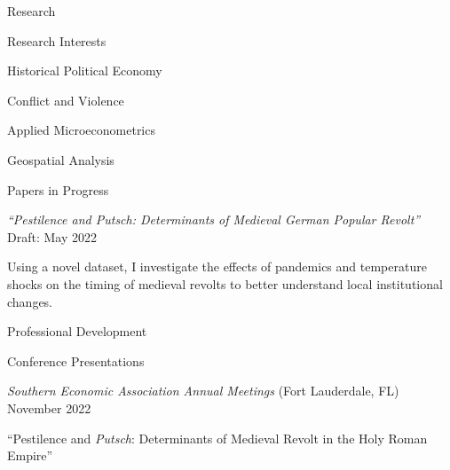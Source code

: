 \documentclass{resume} %
\begin{document}
\begin{rSection}{Research}

    \begin{rSubsection}{Research Interests}{}{}{}
        \item Historical Political Economy
        \item Conflict and Violence
        \item Applied Microeconometrics
        \item Geospatial Analysis
    \end{rSubsection}
    \vspace{-1mm} %
    \begin{rSubsection}{Papers in Progress}{}{}{}
        \item[] \hspace{-5mm} \textit{``Pestilence and \textrm{Putsch}: Determinants of Medieval German Popular Revolt''} \hfill{Draft: May 2022}
        \item Using a novel dataset, I investigate the effects of pandemics and temperature shocks on the timing of medieval revolts to better understand local institutional changes.
    \end{rSubsection}

\end{rSection}


\begin{rSection}{Professional Development}

    \begin{rSubsection}{Conference Presentations}{}{}{}
        \item[] \hspace{-5mm} \textit{Southern Economic Association Annual Meetings} (Fort Lauderdale, FL) \hfill{November 2022}
        \item ``Pestilence and \textit{Putsch}: Determinants of Medieval Revolt in the Holy Roman Empire''
    \end{rSubsection}

\end{rSection}
\end{document}
